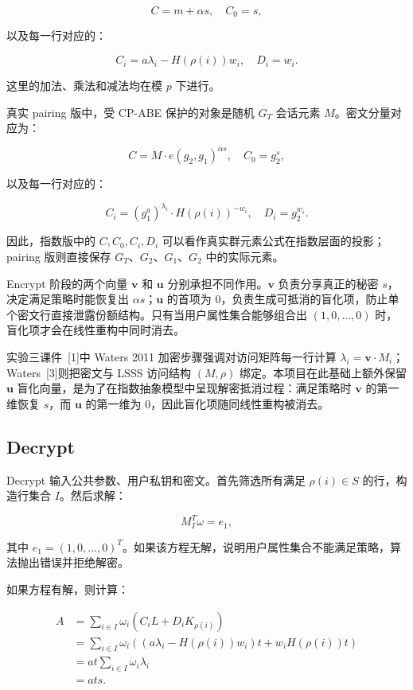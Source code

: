 \[
    C=m+\alpha s,\quad C_0=s,
\]

以及每一行对应的：

\[
    C_i=a\lambda_i-H(\rho(i))w_i,\quad D_i=w_i.
\]

这里的加法、乘法和减法均在模 $p$ 下进行。

真实 pairing 版中，受 CP-ABE 保护的对象是随机 $G_T$ 会话元素 $M$。密文分量对应为：

\[
    C=M\cdot e(g_2,g_1)^{\alpha s},\quad C_0=g_2^s,
\]

以及每一行对应的：

\[
    C_i=(g_1^a)^{\lambda_i}\cdot H(\rho(i))^{-w_i},\quad D_i=g_2^{w_i}.
\]

因此，指数版中的 $C,C_0,C_i,D_i$ 可以看作真实群元素公式在指数层面的投影；pairing 版则直接保存 $G_T$、$G_2$、$G_1$、$G_2$ 中的实际元素。

Encrypt 阶段的两个向量 $\mathbf{v}$ 和 $\mathbf{u}$ 分别承担不同作用。$\mathbf{v}$ 负责分享真正的秘密 $s$，决定满足策略时能恢复出 $\alpha s$；$\mathbf{u}$ 的首项为 $0$，负责生成可抵消的盲化项，防止单个密文行直接泄露份额结构。只有当用户属性集合能够组合出 $(1,0,\dots,0)$ 时，盲化项才会在线性重构中同时消去。

实验三课件~[1]中 Waters 2011 加密步骤强调对访问矩阵每一行计算 $\lambda_i=\mathbf{v}\cdot M_i$；Waters~[3]则把密文与 LSSS 访问结构 $(M,\rho)$ 绑定。本项目在此基础上额外保留 $\mathbf{u}$ 盲化向量，是为了在指数抽象模型中呈现解密抵消过程：满足策略时 $\mathbf{v}$ 的第一维恢复 $s$，而 $\mathbf{u}$ 的第一维为 $0$，因此盲化项随同线性重构被消去。

\subsection{Decrypt}

Decrypt 输入公共参数、用户私钥和密文。首先筛选所有满足 $\rho(i)\in S$ 的行，构造行集合 $I$。然后求解：

\[
    M_I^T\omega=e_1,
\]

其中 $e_1=(1,0,\dots,0)^T$。如果该方程无解，说明用户属性集合不能满足策略，算法抛出错误并拒绝解密。

如果方程有解，则计算：

\[
\begin{aligned}
A &= \sum_{i\in I}\omega_i(C_iL+D_iK_{\rho(i)})\\
  &= \sum_{i\in I}\omega_i((a\lambda_i-H(\rho(i))w_i)t+w_iH(\rho(i))t)\\
  &= at\sum_{i\in I}\omega_i\lambda_i\\
  &= ats.
\end{aligned}
\]

